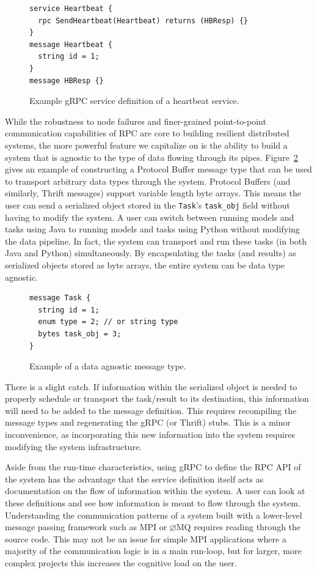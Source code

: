 \documentclass[conference]{IEEEtran}
\begin{document}
\begin{figure}
  \begin{lstlisting}
service Heartbeat {
  rpc SendHeartbeat(Heartbeat) returns (HBResp) {}
}
message Heartbeat {
  string id = 1;
}
message HBResp {}
\end{lstlisting}
\caption{Example gRPC service definition of a heartbeat service.}
\label{fig:heartbeat}
\end{figure}

While the robustness to node failures and finer-grained point-to-point
communication capabilities of RPC are core to building resilient distributed
systems, the more powerful feature we capitalize on is the ability to build a
system that is agnostic to the type of data flowing through its
pipes. Figure~\ref{fig:data-agnostic} gives an example of constructing a
Protocol Buffer message type that can be used to transport arbitrary data types
through the system. Protocol Buffers (and similarly, Thrift messages) support
variable length byte arrays. This means the
user can send a serialized object stored in the \texttt{Task}'s
\texttt{task\_obj} field without having to modify the system.  A user can switch
between running models and tasks using Java to running models and tasks using
Python without modifying the data pipeline. In fact, the system can transport
and run these tasks (in both Java and Python) simultaneously. By encapsulating
the tasks (and results) as serialized objects stored as byte arrays, the entire
system can be data type agnostic.

\begin{figure}
  \begin{lstlisting}
message Task {
  string id = 1;
  enum type = 2; // or string type
  bytes task_obj = 3;
}
  \end{lstlisting}
  \caption{Example of a data agnostic message type.}\label{fig:data-agnostic}
\end{figure}

There is a slight catch. If information within the serialized object
is needed to properly schedule or transport the task/result to its
destination, this information will need to be added to the message
definition. This requires recompiling the message types and regenerating
the gRPC (or Thrift) stubs. This is a minor inconvenience, as incorporating
this new information into the system requires modifying the system
infrastructure.

Aside from the run-time characteristics, using gRPC to define the RPC API of the
system has the advantage that the service definition itself acts as
documentation on the flow of information within the system. A user can look at
these definitions and see how information is meant to flow through the
system. Understanding the communication patterns of a system built with a
lower-level message passing framework such as MPI or $\varnothing$MQ \cite{zmq}
requires reading through the source code. This may not be an issue for simple
MPI applications where a majority of the communication logic is in a main
run-loop, but for larger, more complex projects this increases the cognitive
load on the user.
\end{document}
